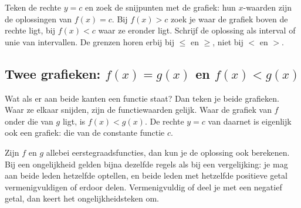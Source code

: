 \begin{werkwijze}
Teken de rechte $y = c$ en zoek de snijpunten met de grafiek: hun $x$-waarden zijn de oplossingen van $f(x) = c$. Bij $f(x) > c$ zoek je waar de grafiek boven de rechte ligt, bij $f(x) < c$ waar ze eronder ligt. Schrijf de oplossing als interval of unie van intervallen. De grenzen horen erbij bij $\leqslant$ en $\geqslant$, niet bij $<$ en $>$.
\end{werkwijze}

\begin{oefeningen}
\end{oefeningen}

\subsection{Twee grafieken: $f(x) = g(x)$ en $f(x) < g(x)$}

Wat als er aan beide kanten een functie staat? Dan teken je beide grafieken. Waar ze elkaar snijden, zijn de functiewaarden gelijk. Waar de grafiek van $f$ onder die van $g$ ligt, is $f(x) < g(x)$. De rechte $y = c$ van daarnet is eigenlijk ook een grafiek: die van de constante functie $c$.


Zijn $f$ en $g$ allebei eerstegraadsfuncties, dan kun je de oplossing ook berekenen. Bij een ongelijkheid gelden bijna dezelfde regels als bij een vergelijking: je mag aan beide leden hetzelfde optellen, en beide leden met hetzelfde positieve getal vermenigvuldigen of erdoor delen. Vermenigvuldig of deel je met een negatief getal, dan keert het ongelijkheidsteken om.

